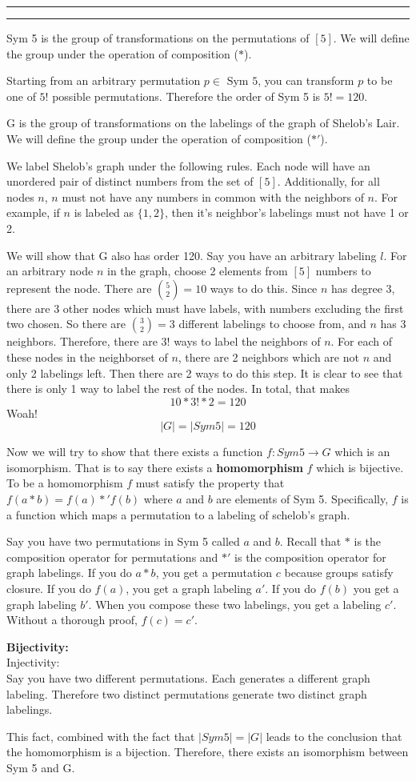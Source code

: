 \documentclass[11pt]{article}
\newcounter{questionCounter}
\newcounter{partCounter}[questionCounter]
\newenvironment{question}[2][\arabic{questionCounter}]{%
    \setcounter{partCounter}{0}%
    \vspace{.25in} \hrule \vspace{0.5em}%
        \noindent{\bf #2}%
    \vspace{0.8em} \hrule \vspace{.10in}%
    \addtocounter{questionCounter}{1}%
}{}
\begin{document}
\begin{question}{Shelob's Lair}
Sym 5 is the group of transformations on the permutations of $[5]$.
We will define the group under the operation of composition ($*$).

Starting from an arbitrary permutation $p\in\text{ Sym 5}$, you can transform $p$
to be one of $5!$ possible permutations. Therefore the order of Sym 5 is $5! = 120$.

G is the group of transformations on the labelings of the graph of Shelob's Lair.
We will define the group under the operation of composition ($*'$).

We label Shelob's graph under the following rules. Each node will have an unordered pair
of distinct numbers from the set of $[5]$. Additionally, for all nodes $n$, $n$ must not have 
any numbers in common with the neighbors of $n$. For example, if $n$ is labeled as $\{1,2\}$,
then it's neighbor's labelings must not have 1 or 2. 

We will show that G also has order 120. Say you have an arbitrary labeling $l$. For an arbitrary
node $n$ in the graph, choose 2 elements from $[5]$ numbers to represent the node. 
There are $\binom{5}{2}=10$ ways to do this.
Since $n$ has degree 3, there are 3 other nodes which must have labels, with numbers excluding the first 
two chosen. So there are $\binom{3}{2}=3$ different labelings to choose from, and $n$ has 3 neighbors.
Therefore, there are $3!$ ways to label the neighbors of $n$. For each of these nodes in the neighborset
of $n$, there are 2 neighbors which are not $n$ and only 2 labelings left. Then there are 2 ways to do
this step. It is clear to see that there is only 1 way to label the rest of the nodes. In total, that makes
$$10*3!*2=120$$
Woah!
$$|G|=|Sym 5|=120$$

Now we will try to show that there exists a function $f:Sym 5 \rightarrow G$ which is an isomorphism. That is to say there 
exists a \textbf{homomorphism} $f$ which is bijective. To be a homomorphism $f$ must satisfy the property that
$f(a*b)=f(a)*'f(b)$ where $a$ and $b$ are elements of Sym 5. Specifically, $f$ is a function which maps a permutation
to a labeling of schelob's graph.

Say you have two permutations in Sym 5 called $a$ and $b$. Recall that $*$ is the composition operator for 
permutations and $*'$ is the composition operator for graph labelings. If you do $a*b$, you get a permutation
$c$ because groups satisfy closure. If you do $f(a)$, you get a graph labeling $a'$. If you do $f(b)$
you get a graph labeling $b'$. When you compose these two labelings, you get a labeling $c'$. Without a 
thorough proof, $f(c)=c'$.

\textbf{Bijectivity:}\\
Injectivity:\\
Say you have two different permutations. Each generates a different graph labeling. Therefore
two distinct permutations generate two distinct graph labelings.

This fact, combined with the fact that $|Sym 5| = |G|$ leads to the conclusion 
that the homomorphism is a bijection. Therefore, there exists an isomorphism
between Sym 5 and G.


\end{question}
\end{document}
